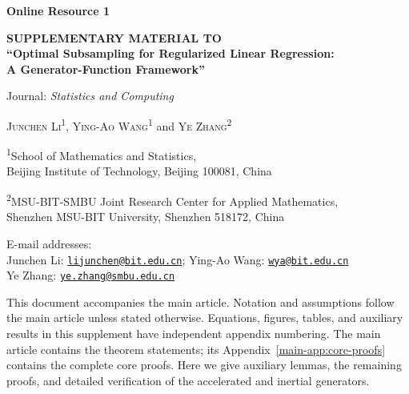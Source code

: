 \documentclass[11pt,a4paper,leqno]{article}
\numberwithin{equation}{section}
\numberwithin{figure}{section}
\numberwithin{table}{section}
\theoremstyle{plain}
\theoremstyle{definition}
\theoremstyle{remark}
\begin{document}
\thispagestyle{plain}

\begin{center}
  {\normalsize\textbf{Online Resource 1}\par}
  \vspace{0.3em}
  {\large\bfseries SUPPLEMENTARY MATERIAL TO\\[0.4em]
  ``Optimal Subsampling for Regularized Linear Regression:\\
  A Generator-Function Framework''\par}
  \vspace{0.3em}
  {\normalsize Journal: \emph{Statistics and Computing}\par}
  \vspace{0.5em}
  {\normalsize\textsc{Junchen Li}\textsuperscript{1},
  \textsc{Ying-Ao Wang}\textsuperscript{1} and
  \textsc{Ye Zhang}\textsuperscript{2}\par}
  \vspace{0.3em}
  {\small
  \textsuperscript{1}School of Mathematics and Statistics,\\
  Beijing Institute of Technology, Beijing 100081, China\par
  \vspace{0.3em}
  \textsuperscript{2}MSU-BIT-SMBU Joint Research Center for Applied Mathematics,\\
  Shenzhen MSU-BIT University, Shenzhen 518172, China\par
  \vspace{0.3em}
  E-mail addresses:\\
  Junchen Li: \href{mailto:lijunchen@bit.edu.cn}{\nolinkurl{lijunchen@bit.edu.cn}};\quad
  Ying-Ao Wang: \href{mailto:wya@bit.edu.cn}{\nolinkurl{wya@bit.edu.cn}}\\
  Ye Zhang: \href{mailto:ye.zhang@smbu.edu.cn}{\nolinkurl{ye.zhang@smbu.edu.cn}}\par}
\end{center}

This document accompanies the main article. Notation and assumptions follow
the main article unless stated otherwise. Equations, figures, tables, and
auxiliary results in this supplement have independent appendix numbering.
The main article contains the theorem statements; its
Appendix~\ref{main-app:core-proofs} contains the complete core proofs.
Here we give auxiliary lemmas, the remaining proofs, and detailed
verification of the accelerated and inertial generators.
\end{document}
